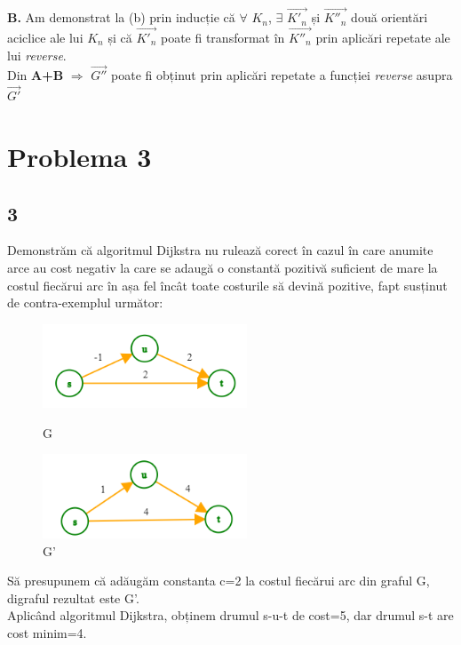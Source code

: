 \documentclass[12pt] {fphw}
\begin{document}
\textbf{B.} Am demonstrat la (b) prin inducție că $\forall$  {${K_n}$}, $\exists$ {$\vec{K'_n}$} și {$\vec{K''_n}$} două orientări aciclice ale lui  {${K_n}$} și că {$\vec{K'_n}$} poate fi transformat în {$\vec{K''_n}$} prin aplicări repetate ale lui \textit{reverse}. \\

Din \textbf{A+B} $\Longrightarrow$ {$\vec{G''}$} poate fi obținut prin aplicări repetate a funcției \textit{reverse} asupra {$\vec{G'}$} 

\section*{Problema 3}
\subsection*{3}
Demonstrăm că algoritmul Dijkstra nu rulează corect în cazul în care anumite arce au cost negativ la care se adaugă o constantă pozitivă suficient de mare la costul fiecărui arc în așa fel încât toate costurile să devină pozitive, fapt susținut de contra-exemplul următor:

\begin{figure}[h] 
\begin{minipage}[c]{ .3\linewidth}
\includegraphics [height=2.5cm]{graph6.png}
\caption{G}
\end{minipage}\hfill
\begin{minipage}[c]{.3\linewidth}
\includegraphics [height=2.5cm]{graph7.png}
\caption{G'}
\end{minipage}
\end{figure}

Să presupunem că adăugăm constanta c=2 la costul fiecărui arc din graful G, digraful rezultat este G'. \\

Aplicând algoritmul Dijkstra, obținem drumul s-u-t de cost=5, dar drumul s-t are cost minim=4. 
\end{document}
